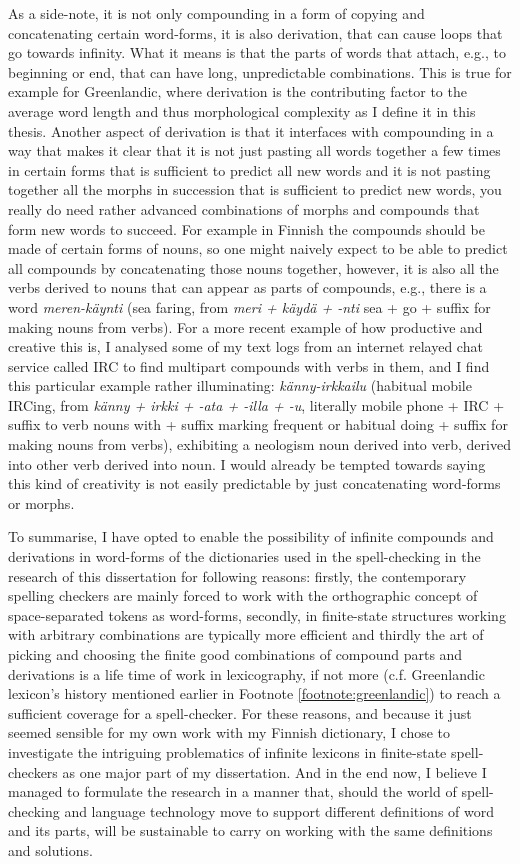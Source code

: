 \documentclass[officiallayout]{unihelcompling}
\begin{document}
As a side-note, it is not only compounding in a form of copying and
concatenating certain word-forms, it is also derivation, that can cause loops
that go towards infinity. What it means is that the parts of words that attach,
e.g., to beginning or end, that can have long, unpredictable combinations. This
is true for example for Greenlandic, where derivation is the contributing
factor to the average word length and thus \gls{morphological complexity} as I
define it in this thesis.  Another aspect of derivation is that it interfaces
with compounding in a way that makes it clear that it is not just pasting all
words together a few times in certain forms that is sufficient to predict
all new words and it is not pasting together all the morphs in succession that
is sufficient to predict new words, you really do need rather advanced combinations of
morphs and compounds that form new words to succeed. For example in Finnish
the compounds should be made of certain forms of nouns, so one might naively
expect to be able to predict all compounds by concatenating those nouns
together, however, it is also all the verbs derived to nouns that can appear as
parts of compounds, e.g., there is a word \emph{meren-käynti} (sea
faring, from \emph{meri + käydä + -nti} sea + go + suffix for making nouns from
verbs).  For a more recent example of how productive and creative this is, I
analysed some of my text logs from an internet relayed chat service called IRC
to find multipart compounds with verbs in them, and I find this particular
example rather illuminating: \emph{känny-irkkailu} (habitual mobile IRCing,
from \emph{känny + irkki + -ata + -illa + -u}, literally mobile phone + IRC +
suffix to verb nouns with + suffix marking frequent or habitual doing + suffix
for making nouns from verbs), exhibiting a neologism noun derived into verb,
derived into other verb derived into noun.  I would already be tempted towards
saying this kind of creativity is not easily predictable by just concatenating
word-forms or morphs.

To summarise, I have opted to enable the possibility of infinite compounds
and derivations in word-forms of the dictionaries used in the spell-checking in
the research of this dissertation for following reasons: firstly, the
contemporary spelling checkers are mainly forced to work with the orthographic
concept of space-separated tokens as word-forms, secondly, in finite-state
structures working with arbitrary combinations are typically more efficient and
thirdly the art of picking and choosing the finite good combinations of
compound parts and derivations is a life time of work in lexicography, if not
more (c.f. Greenlandic lexicon's history mentioned earlier in Footnote
\ref{footnote:greenlandic}) to reach a sufficient coverage for a spell-checker.
For these reasons, and because it just seemed sensible for my own work with my
Finnish dictionary, I chose to investigate the intriguing problematics of
infinite lexicons in finite-state spell-checkers as one major part of my
dissertation. And in the end now, I believe I managed to formulate the research
in a manner that, should the world of spell-checking and language technology
move to support different definitions of word and its parts, will be
sustainable to carry on working with the same definitions and solutions.
\end{document}
